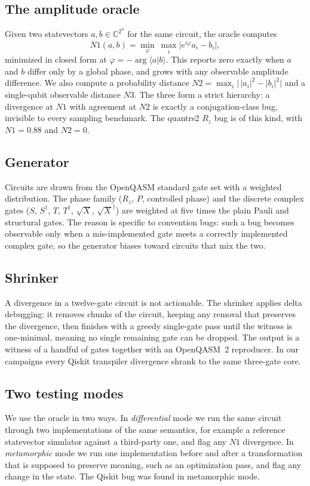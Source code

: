 \documentclass[11pt]{article}
\begin{document}
\subsection{The amplitude oracle}
Given two statevectors $a, b \in \mathbb{C}^{2^n}$ for the same circuit,
the oracle computes
\[
N1(a,b) = \min_{\varphi}\ \max_i \bigl\lvert e^{i\varphi} a_i - b_i \bigr\rvert ,
\]
minimized in closed form at $\varphi = -\arg\langle a \vert b\rangle$.
This reports zero exactly when $a$ and $b$ differ only by a global phase,
and grows with any observable amplitude difference. We also compute a
probability distance $N2 = \max_i \lvert\,\lvert a_i\rvert^2 -
\lvert b_i\rvert^2\rvert$ and a single-qubit observable distance $N3$. The
three form a strict hierarchy: a divergence at $N1$ with agreement at
$N2$ is exactly a conjugation-class bug, invisible to every sampling
benchmark. The quantrs2 $R_z$ bug is of this kind, with $N1 = 0.88$ and
$N2 = 0$.

\subsection{Generator}
Circuits are drawn from the OpenQASM standard gate set with a weighted
distribution. The phase family ($R_z$, $P$, controlled phase) and the
discrete complex gates ($S$, $S^\dagger$, $T$, $T^\dagger$, $\sqrt{X}$,
$\sqrt{X}^\dagger$) are weighted at five times the plain Pauli and
structural gates. The reason is specific to convention bugs: such a bug
becomes observable only when a mis-implemented gate meets a correctly
implemented complex gate, so the generator biases toward circuits that
mix the two.

\subsection{Shrinker}
A divergence in a twelve-gate circuit is not actionable. The shrinker
applies delta debugging: it removes chunks of the circuit, keeping any
removal that preserves the divergence, then finishes with a greedy
single-gate pass until the witness is one-minimal, meaning no single
remaining gate can be dropped. The output is a witness of a handful of
gates together with an OpenQASM~2 reproducer. In our campaigns every
Qiskit transpiler divergence shrank to the same three-gate core.

\subsection{Two testing modes}
We use the oracle in two ways. In \emph{differential} mode we run the
same circuit through two implementations of the same semantics, for
example a reference statevector simulator against a third-party one, and
flag any $N1$ divergence. In \emph{metamorphic} mode we run one
implementation before and after a transformation that is supposed to
preserve meaning, such as an optimization pass, and flag any change in
the state. The Qiskit bug was found in metamorphic mode.
\end{document}
